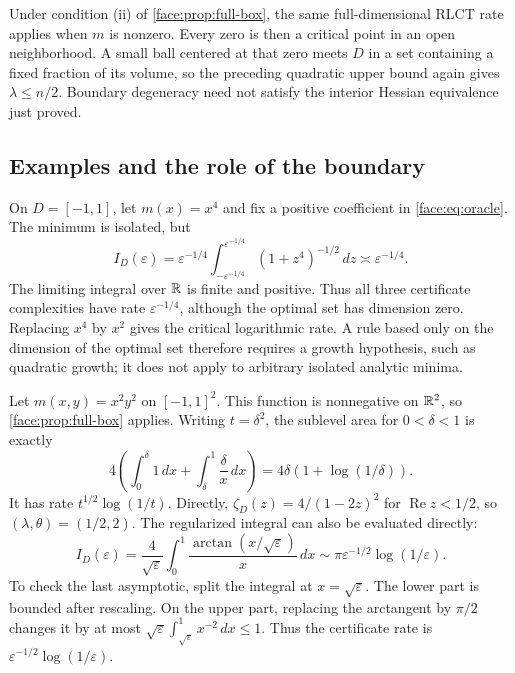 Under condition (ii) of \cref{face:prop:full-box}, the same
full-dimensional RLCT rate applies when $m$ is nonzero.  Every zero is
then a critical point in an open neighborhood.  A small ball centered
at that zero meets $D$ in a set containing a fixed fraction of its
volume, so the preceding quadratic upper bound again gives
$\lambda\le n/2$.  Boundary degeneracy need not satisfy the interior
Hessian equivalence just proved.

\subsection{Examples and the role of the boundary}

\begin{example}
 \label{face:ex:quartic}
On $D=[-1,1]$, let $m(x)=x^4$ and fix a positive coefficient in
\eqref{face:eq:oracle}.  The minimum is isolated, but
\[
 I_D(\varepsilon)
 =\varepsilon^{-1/4}
 \int_{-\varepsilon^{-1/4}}^{\varepsilon^{-1/4}}
       (1+z^4)^{-1/2}\,dz
 \asymp\varepsilon^{-1/4}.
\]
The limiting integral over $\mathbb{R}$ is finite and positive.  Thus all three
certificate complexities have rate $\varepsilon^{-1/4}$, although the
optimal set has dimension zero.  Replacing $x^4$ by $x^2$ gives the
critical logarithmic rate.  A rule based only on the dimension of the
optimal set therefore requires a growth hypothesis, such as quadratic
growth; it does not apply to arbitrary isolated analytic minima.
\end{example}

\begin{example}
 \label{face:ex:product}
Let $m(x,y)=x^2y^2$ on $[-1,1]^2$.  This function is nonnegative on
$\mathbb{R}^2$, so \cref{face:prop:full-box} applies.  Writing $t=\delta^2$,
the sublevel area for $0<\delta<1$ is exactly
\[
 4\left(\int_0^\delta 1\,dx+
          \int_\delta^1\frac\delta x\,dx\right)
 =4\delta(1+\log(1/\delta)).
\]
It has rate $t^{1/2}\log(1/t)$.  Directly,
$\zeta_D(z)=4/(1-2z)^2$ for $\operatorname{Re}z<1/2$, so
$(\lambda,\theta)=(1/2,2)$.
The regularized integral can also be evaluated directly:
\[
 I_D(\varepsilon)
 =\frac4{\sqrt\varepsilon}
 \int_0^1\frac{\arctan(x/\sqrt\varepsilon)}x\,dx
 \sim\pi\varepsilon^{-1/2}\log(1/\varepsilon).
\]
To check the last asymptotic, split the integral at
$x=\sqrt\varepsilon$.  The lower part is bounded after rescaling.
On the upper part, replacing the arctangent by $\pi/2$ changes it by
at most $\sqrt\varepsilon\int_{\sqrt\varepsilon}^1x^{-2}\,dx\le1$.
Thus the certificate rate is
$\varepsilon^{-1/2}\log(1/\varepsilon)$.
\end{example}

